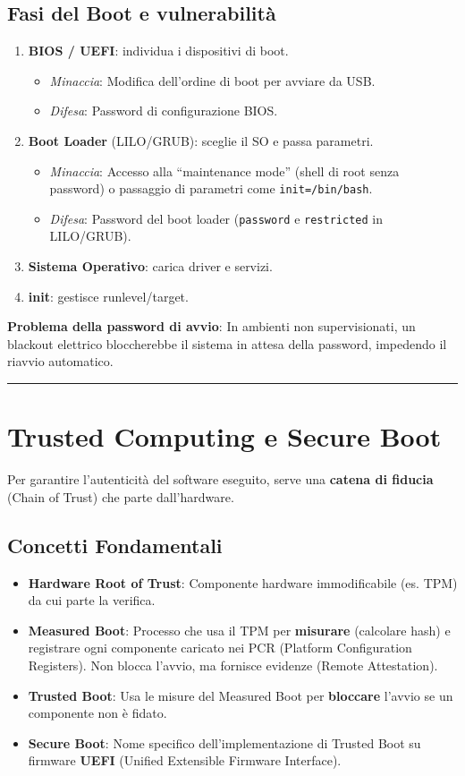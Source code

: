 \documentclass[12pt, a4paper]{report}
\begin{document}
\subsection{Fasi del Boot e vulnerabilità}
\begin{enumerate}
	\item \textbf{BIOS / UEFI}: individua i dispositivi di boot.
	\begin{itemize}
		\item \textit{Minaccia}: Modifica dell'ordine di boot per avviare da USB.
		\item \textit{Difesa}: Password di configurazione BIOS.
	\end{itemize}
	\item \textbf{Boot Loader} (LILO/GRUB): sceglie il SO e passa parametri.
	\begin{itemize}
		\item \textit{Minaccia}: Accesso alla ``maintenance mode'' (shell di root senza password) o passaggio di parametri come \texttt{init=/bin/bash}.
		\item \textit{Difesa}: Password del boot loader (\texttt{password} e \texttt{restricted} in LILO/GRUB).
	\end{itemize}
	\item \textbf{Sistema Operativo}: carica driver e servizi.
	\item \textbf{init}: gestisce runlevel/target.
\end{enumerate}

\textbf{Problema della password di avvio}: In ambienti non supervisionati, un blackout elettrico bloccherebbe il sistema in attesa della password, impedendo il riavvio automatico.

\noindent\rule{\textwidth}{0.4pt}

\section{Trusted Computing e Secure Boot}

Per garantire l'autenticità del software eseguito, serve una \textbf{catena di fiducia} (Chain of Trust) che parte dall'hardware.

\subsection{Concetti Fondamentali}
\begin{itemize}
	\item \textbf{Hardware Root of Trust}: Componente hardware immodificabile (es. TPM) da cui parte la verifica.
	\item \textbf{Measured Boot}: Processo che usa il TPM per \textbf{misurare} (calcolare hash) e registrare ogni componente caricato nei PCR (Platform Configuration Registers). Non blocca l'avvio, ma fornisce evidenze (Remote Attestation).
	\item \textbf{Trusted Boot}: Usa le misure del Measured Boot per \textbf{bloccare} l'avvio se un componente non è fidato.
	\item \textbf{Secure Boot}: Nome specifico dell'implementazione di Trusted Boot su firmware \textbf{UEFI} (Unified Extensible Firmware Interface).
\end{itemize}
\end{document}
